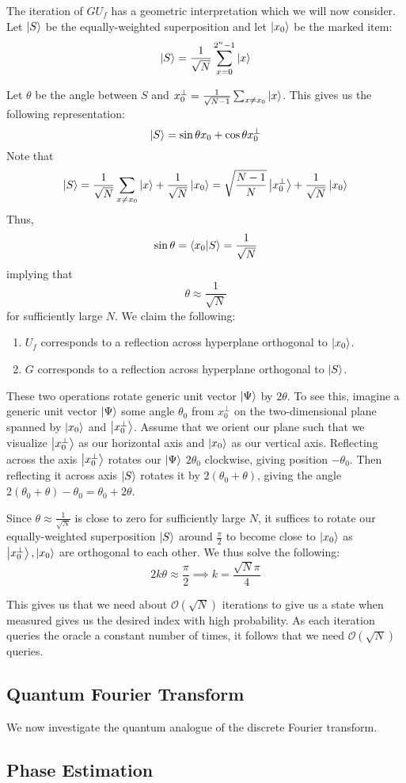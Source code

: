 \documentclass{../quantum.tex}
\begin{document}
The iteration of $GU_f$ has a geometric interpretation which we will now consider. Let $\ket{S}$ be the equally-weighted superposition and let $\ket{x_0}$ be the marked item:
$$ \ket{S} = \frac{1}{\sqrt{N}} \sum_{x=0}^{2^n-1} \ket{x}  $$

Let $\theta$ be the angle between $S$ and $x_0^{\perp} = \frac{1}{\sqrt{N-1}}\sum_{x\neq x_0} \ket{x}$. This gives us the following representation:
$$ \ket{S} =  \sin{\theta}x_0 + \cos{\theta}{x_0^{\perp}}$$
Note that
$$ \ket{S} = \frac{1}{\sqrt{N}}\sum_{x \neq x_0} \ket{x} + \frac{1}{\sqrt{N}}\ket{x_0} = \sqrt{\frac{N-1}{N}}\ket{x_0^{\perp}} + \frac{1}{\sqrt{N}}\ket{x_0}$$
Thus,
$$\sin{\theta} = \bra{x_0}\ket{S} = \frac{1}{\sqrt{N}}$$
implying that
$$ \theta \approx \frac{1}{\sqrt{N}} $$ for sufficiently large $N$.
We claim the following:
\begin{enumerate}
  \item $U_f$ corresponds to a reflection across hyperplane orthogonal to $\ket{x_0}$.
  \item $G$ corresponds to a reflection across hyperplane orthogonal to $\ket{S}$.
\end{enumerate}

These two operations rotate generic unit vector $\ket{\Psi}$ by $2\theta$. To see this, imagine a generic unit vector $\ket{\Psi}$ some angle $\theta_0$ from $x_0^{\perp}$ on the two-dimensional plane spanned by $\ket{x_0}$ and $\ket{x_0^{\perp}}$. Assume that we orient our plane such that we visualize $\ket{x_0^{\perp}}$ as our horizontal axis and $\ket{x_0}$ as our vertical axis. Reflecting across the axis $\ket{x_0^{\perp}}$ rotates our $\ket{\Psi}$ $2\theta_0$ clockwise, giving position $-\theta_0$. Then reflecting it across axis $\ket{S}$ rotates it by $2(\theta_0 + \theta)$, giving the angle $2(\theta_0 + \theta) - \theta_0 = \theta_0 + 2\theta$.

Since $\theta \approx \frac{1}{\sqrt{N}}$ is close to zero for sufficiently large $N$, it suffices to rotate our equally-weighted superposition $\ket{S}$ around $\frac{\pi}{2}$ to become close to $\ket{x_0}$ as $\ket{x_0^{\perp}},\ket{x_0}$ are orthogonal to each other. We thus solve the following:
$$2k\theta \approx \frac{\pi}{2} \implies k = \frac{\sqrt{N}\pi}{4} $$

This gives us that we need about $\mathcal{O}(\sqrt{N})$ iterations to give us a state when measured gives us the desired index with high probability. As each iteration queries the oracle a constant number of times, it follows that we need $\mathcal{O}(\sqrt{N})$ queries.

\subsection{Quantum Fourier Transform}

We now investigate the quantum analogue of the discrete Fourier transform.




\subsection{Phase Estimation}
\end{document}
